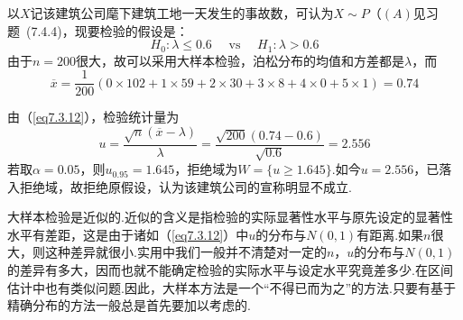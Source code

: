 \begin{solution}
	以$X$记该建筑公司麾下建筑工地一天发生的事故数，可认为$X\sim P（(A)$见习题~(7.4.4)，现要检验的假设是：
	\[H _ { 0 } : \lambda \leq 0.6 \quad \text { vs } \quad H _ { 1 } : \lambda > 0.6\]
	由于$n=200$很大，故可以采用大样本检验，泊松分布的均值和方差都是$\lambda$，而
	\[\overline { x } = \frac { 1 } { 200 } ( 0 \times 102 + 1 \times 59 + 2 \times 30 + 3 \times 8 + 4 \times 0 + 5 \times 1 )=0.74\]
	
	由（\ref{eq7.3.12}），检验统计量为
	\[u = \frac { \sqrt { n } ( \overline { x } - \lambda ) } { \lambda } = \frac { \sqrt { 200 } ( 0.74 - 0.6 ) } { \sqrt { 0.6 } } = 2.556\]
	若取$\alpha=0.05$，则$u_{0.95}=1.645$，拒绝域为$W=\{u\geq 1.645\}$.如今$u=
	2.556$，已落入拒绝域，故拒绝原假设，认为该建筑公司的宣称明显不成立.
	
	大样本检验是近似的.近似的含义是指检验的实际显著性水平与原先设定的显著性水平有差距，这是由于诸如（\ref{eq7.3.12}）中$u$的分布与$N(0,1)$有距离.如果$n$很大，则这种差异就很小.实用中我们一般并不清楚对一定的$n$，$u$的分布与$N(0,1)$的差异有多大，因而也就不能确定检验的实际水平与设定水平究竟差多少.在区间估计中也有类似问题.因此，大样本方法是一个“不得已而为之”的方法.只要有基于精确分布的方法一般总是首先要加以考虑的.
\end{solution}
